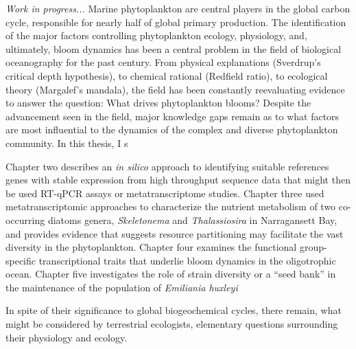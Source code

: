 % 
% 
%
\textit{Work in progress... }
Marine phytoplankton are central players in the global carbon cycle, responsible for nearly half of global primary production. The identification of the major factors controlling phytoplankton ecology, physiology, and, ultimately, bloom dynamics has been a central problem in the field of biological oceanography for the past century. From physical explanations (Sverdrup's critical depth hypothesis), to chemical rational (Redfield ratio), to ecological theory (Margalef's mandala), the field has been constantly reevaluating evidence to answer the question: What drives phytoplankton blooms? Despite the advancement seen in the field, major knowledge gaps remain as to what factors are most influential to the dynamics of the complex and diverse phytoplankton community. In this thesis, I s


Chapter two describes an \textit{in silico} approach to identifying suitable references genes with stable expression from high throughput sequence data that might then be used RT-qPCR assays or metatranscriptome studies. Chapter three used metatranscriptomic approaches to characterize the nutrient metabolism of two co-occurring diatoms genera, \textit{Skeletonema} and \textit{Thalassiosira} in Narragansett Bay, and provides evidence that suggests resource partitioning may facilitate the vast diversity in the phytoplankton. Chapter four examines the functional group-specific transcriptional traits that underlie bloom dynamics in the oligotrophic ocean. Chapter five investigates the role of strain diversity or a ``seed bank'' in the maintenance of the population of \textit{Emiliania huxleyi}


In spite of their significance to global biogeochemical cycles, there remain, what might be considered by terrestrial ecologists, elementary questions surrounding their physiology and ecology.



